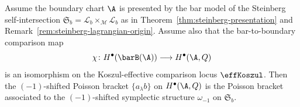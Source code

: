 \providecommand{\Steinb}{\mathfrak{S}}

\begin{proposition}
\label{prop:PVA-from-symplectic}
Assume the boundary chart $\A$ is presented by the bar model of the
Steinberg self-intersection
$\Steinb_b = \mathscr{L}_b \times_{\mathscr{M}} \mathscr{L}_b$
as in Theorem~\textup{\ref{thm:steinberg-presentation}} and
Remark~\textup{\ref{rem:steinberg-lagrangian-origin}}. Assume also
that the bar-to-boundary comparison map
\[
\chi\colon H^\bullet(\barB(\A))\longrightarrow H^\bullet(\A,Q)
\]
is an isomorphism on the Koszul-effective comparison locus
\(\effKoszul\). Then the
$(-1)$-shifted Poisson bracket $\{a_\lambda b\}$ on $H^\bullet(\A,Q)$ is
the Poisson bracket associated to the $(-1)$-shifted symplectic structure
$\omega_{-1}$ on $\Steinb_b$.
\end{proposition}

